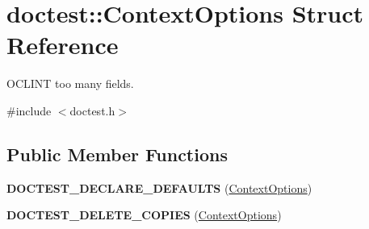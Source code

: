 \hypertarget{structdoctest_1_1_context_options}{}\section{doctest\+::Context\+Options Struct Reference}
\label{structdoctest_1_1_context_options}


O\+C\+L\+I\+NT too many fields.  




{\ttfamily \#include $<$doctest.\+h$>$}

\subsection*{Public Member Functions}
\begin{DoxyCompactItemize}
\item 
\mbox{\label{structdoctest_1_1_context_options_ae86be46c99ae7ca0503bb9c577ff4f12}} 
{\bfseries D\+O\+C\+T\+E\+S\+T\+\_\+\+D\+E\+C\+L\+A\+R\+E\+\_\+\+D\+E\+F\+A\+U\+L\+TS} (\mbox{\hyperlink{structdoctest_1_1_context_options}{Context\+Options}})
\item 
\mbox{\label{structdoctest_1_1_context_options_a76de5d52d9bea6a8effa61b65be80a78}} 
{\bfseries D\+O\+C\+T\+E\+S\+T\+\_\+\+D\+E\+L\+E\+T\+E\+\_\+\+C\+O\+P\+I\+ES} (\mbox{\hyperlink{structdoctest_1_1_context_options}{Context\+Options}})
\end{DoxyCompactItemize}
